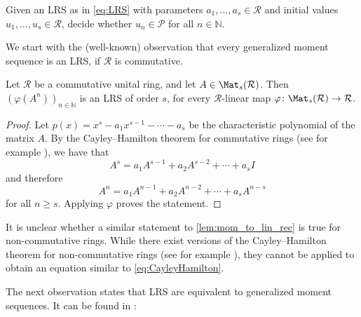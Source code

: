 \begin{problem}\label{prob:lrs} 
Given an LRS as in \eqref{eq:LRS} with parameters $a_1, \ldots, a_s \in \mathcal{R}$ and  initial values $u_1, \ldots, u_s \in \mathcal{R}$, 
decide whether $u_n \in \mathcal{P}$ for all $n \in \mathbb{N}$.
\end{problem}

We start with the (well-known) observation that every generalized moment sequence is an LRS, if $\mathcal{R}$ is commutative.

\begin{lemma}\label{lem:mom_to_lin_rec} 
Let $\mathcal{R}$ be a commutative unital ring, and let $A \in \Mat_s(\mathcal{R})$. Then $\left(\varphi(A^n)\right)_{n\in\mathbb N}$ is an LRS of order $s$, for every $\mathcal{R}$-linear map $\varphi\colon \Mat_s(\mathcal R)\to\mathcal R$.\end{lemma}
\begin{proof}
Let $p(x) = x^s - a_1 x^{s-1} - \cdots - a_s$ be the characteristic polynomial of the matrix $A$. By the Cayley--Hamilton theorem for commutative rings (see for example \cite[Chapter XIV.3]{La02}), we have that
\begin{equation}\label{eq:CayleyHamilton}
A^s = a_1 A^{s-1} + a_2 A^{s-2} + \cdots + a_s I
\end{equation}
and therefore
$$A^n = a_1 A^{n-1} + a_2 A^{n-2} + \cdots + a_s A^{n-s}$$ for all $n\geqslant s.$ Applying $\varphi$ proves the statement.
\end{proof}

It is unclear whether a similar statement to \cref{lem:mom_to_lin_rec} is true for non-commutative rings. While there exist versions of the Cayley--Hamilton theorem for non-commutative rings (see for example \cite{Gr11, Sz06}), they cannot be applied to obtain an equation similar to \eqref{eq:CayleyHamilton}.

The next observation states that LRS are equivalent to generalized moment sequences. It can be found in  \cite{OW}:

